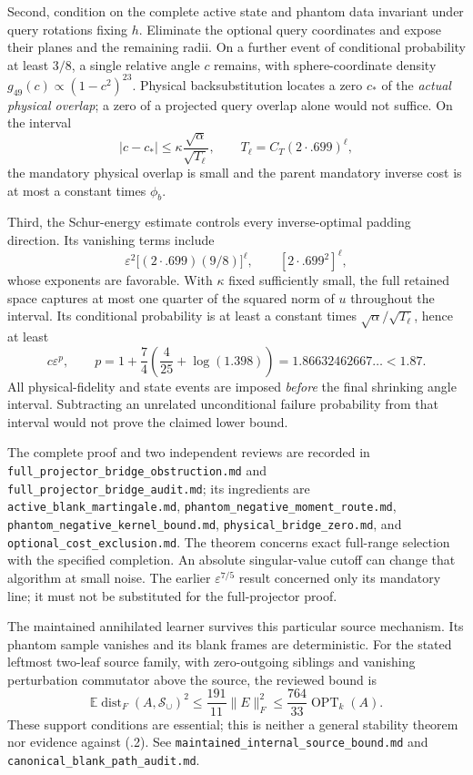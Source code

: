 \documentclass[11pt,oneside,openany,a4paper]{report}
\numberwithin{equation}{chapter}
\theoremstyle{definition}
\theoremstyle{remark}
\newcommand{\sourcefile}[1]{{\small\nolinkurl{#1}}}
\begin{document}
Second, condition on the complete active state and phantom data
invariant under query rotations fixing $h$.  Eliminate the optional
query coordinates and expose their planes and the remaining radii.
On a further event of conditional probability at least $3/8$, a single
relative angle $c$ remains, with sphere-coordinate density
$g_{49}(c)\propto(1-c^2)^{23}$.  Physical backsubstitution locates a
zero $c_*$ of the \emph{actual physical overlap}; a zero of a projected
query overlap alone would not suffice.  On the interval
\[
 |c-c_*|\le\kappa\frac{\sqrt\alpha}{\sqrt{T_\ell}},
 \qquad T_\ell=C_T(2\cdot .699)^\ell,
\]
the mandatory physical overlap is small and the parent mandatory
inverse cost is at most a constant times $\phi_b$.

Third, the Schur-energy estimate controls every inverse-optimal
padding direction.  Its vanishing terms include
\[
 \varepsilon^2\bigl[(2\cdot .699)(9/8)\bigr]^\ell,
 \qquad [2\cdot .699^2]^\ell,
\]
whose exponents are favorable.  With $\kappa$ fixed sufficiently small,
the full retained space captures at most one quarter of the squared
norm of $u$ throughout the interval.  Its conditional probability is
at least a constant times $\sqrt\alpha/\sqrt{T_\ell}$, hence at least
\[
 c\varepsilon^p,\qquad
 p=1+\frac74\left(\frac4{25}+\log(1.398)\right)
   =1.86632462667\ldots<1.87.
\]
All physical-fidelity and state events are imposed \emph{before} the
final shrinking angle interval.  Subtracting an unrelated
unconditional failure probability from that interval would not prove
the claimed lower bound.

The complete proof and two independent reviews are recorded in
\sourcefile{full_projector_bridge_obstruction.md} and
\sourcefile{full_projector_bridge_audit.md}; its ingredients are
\sourcefile{active_blank_martingale.md},
\sourcefile{phantom_negative_moment_route.md},
\sourcefile{phantom_negative_kernel_bound.md},
\sourcefile{physical_bridge_zero.md}, and
\sourcefile{optional_cost_exclusion.md}.  The theorem concerns exact
full-range selection with the specified completion.  An absolute
singular-value cutoff can change that algorithm at small noise.  The
earlier $\varepsilon^{7/5}$ result concerned only its mandatory line;
it must not be substituted for the full-projector proof.

The maintained annihilated learner survives this particular source
mechanism.  Its phantom sample vanishes and its blank frames are
deterministic.  For the stated leftmost two-leaf source family, with
zero-outgoing siblings and vanishing perturbation commutator above the
source, the reviewed bound is
\[
 \mathbb E\operatorname{dist}_F(A,\mathcal S_\cup)^2
 \le\frac{191}{11}\|E\|_F^2
 \le\frac{764}{33}\operatorname{OPT}_k(A).
\]
These support conditions are essential; this is neither a general
stability theorem nor evidence against (\thechapter.2).
See \sourcefile{maintained_internal_source_bound.md} and
\sourcefile{canonical_blank_path_audit.md}.
\end{document}
